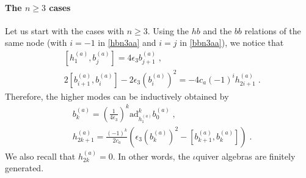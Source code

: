 \documentclass[11pt]{article}
\numberwithin{equation}{section}
\numberwithin{figure}{section}
\numberwithin{table}{section}
\begin{document}
\paragraph{The \texorpdfstring{$n\geq3$}{n>=3} cases} Let us start with the cases with $n\geq3$. Using the $hb$ and the $bb$ relations of the same node (with $i=-1$ in \eqref{hbn3aa} and $i=j$ in \eqref{bbn3aa}), we notice that
\begin{subequations}
	\begin{align}
		&\left[h^{(a)}_1,b^{(a)}_j\right]=4\epsilon_3b^{(a)}_{j+1}\;,\\
		&2\left[b^{(a)}_{i+1},b^{(a)}_i\right]-2\epsilon_3\left(b^{(a)}_i\right)^2=-4c_a(-1)^ih^{(a)}_{2i+1}\;.
	\end{align}
\end{subequations}
Therefore, the higher modes can be inductively obtained by
\begin{subequations}
	\begin{align}
		&b^{(a)}_k=\left(\frac{1}{4\epsilon_3}\right)^k\mathrm{ad}_{h^{(a)}_1}^kb^{(a)}_0\;,\label{higherbn3}\\
		&h^{(a)}_{2k+1}=\frac{(-1)^k}{2c_a}\left(\epsilon_3\left(b^{(a)}_k\right)^2-\left[b^{(a)}_{k+1},b^{(a)}_k\right]\right)\label{higherhn3}\;.
	\end{align}
\end{subequations}
We also recall that $h^{(a)}_{2k}=0$. In other words, the $\iota$quiver algebras are finitely generated.
\end{document}
